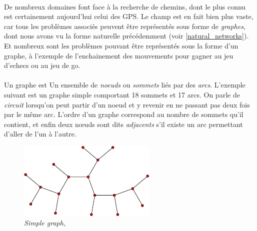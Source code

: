 \paragraph{} De nombreux domaines font face à la recherche de chemins, dont le plus connu est certainement aujourd'hui
celui des GPS. Le champ est en fait bien plus vaste, car tous les problèmes associés peuvent être représentés sous
forme de \emph{graphes}, dont nous avons vu la forme naturelle précédemment (voir \ref{natural_networks}). Et nombreux
sont les problèmes pouvant être représentés sous la forme d'un graphe, à l'exemple de l'enchainement des mouvements pour
gagner au jeu d'echecs ou au jeu de go.

\paragraph{} Un graphe est \guillemotleft Un ensemble de \emph{noeuds} ou \emph{sommets} liés par des \emph{arcs}\guillemotright.
\cite{AI1} L'exemple suivant est un graphe simple comportant 18 sommets et 17 arcs. On parle de \emph{circuit} lorsqu'on
peut partir d'un noeud et y revenir en ne passant pas deux fois par le même arc. L'ordre d'un graphe correspond au nombre
de sommets qu'il contient, et enfin deux n\oe{}uds sont dits \emph{adjacents} s'il existe un arc permettant d'aller de
l'un à l'autre.

\begin{figure}[h]
    \centering
    \includegraphics[width=250px]{chapters/03/images/simple_graph.png}
    \caption{\label{graph}\emph{Simple graph}, \cite{GraphTheory0}}
\end{figure}

